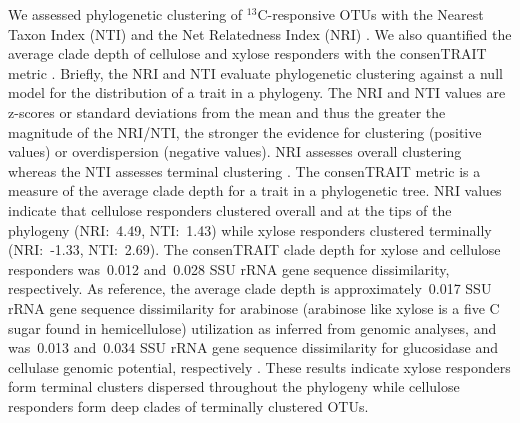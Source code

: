 We assessed phylogenetic clustering of $^{13}$C-responsive OTUs with the
Nearest Taxon Index (NTI) and the Net Relatedness Index (NRI)
\citep{Webb2000}. We also quantified the average clade depth of cellulose and
xylose responders with the consenTRAIT metric \citep{Martiny2013}. Briefly, the
NRI and NTI evaluate phylogenetic clustering against a null model for the
distribution of a trait in a phylogeny. The NRI and NTI values are z-scores or
standard deviations from the mean and thus the greater the magnitude of the
NRI/NTI, the stronger the evidence for clustering (positive values) or
overdispersion (negative values). NRI assesses overall clustering whereas the
NTI assesses terminal clustering \citep{Evans2014a}. The consenTRAIT metric is
a measure of the average clade depth for a trait in a phylogenetic tree. NRI
values indicate that cellulose responders clustered overall and at the tips of
the phylogeny (NRI:~4.49, NTI:~1.43) while xylose responders clustered
terminally (NRI:~-1.33, NTI:~2.69). The consenTRAIT clade depth for xylose and
cellulose responders was~0.012 and~0.028 SSU rRNA gene sequence dissimilarity,
respectively. As reference, the average clade depth is approximately~0.017 SSU
rRNA gene sequence dissimilarity for arabinose (arabinose like xylose is a five C sugar found in
hemicellulose) utilization as inferred from genomic analyses, and was~0.013
and~0.034 SSU rRNA gene sequence dissimilarity for glucosidase and cellulase
genomic potential, respectively \citep{Martiny2013,Berlemont2013}. These
results indicate xylose responders form terminal clusters dispersed throughout
the phylogeny while cellulose responders form deep clades of terminally
clustered OTUs.
